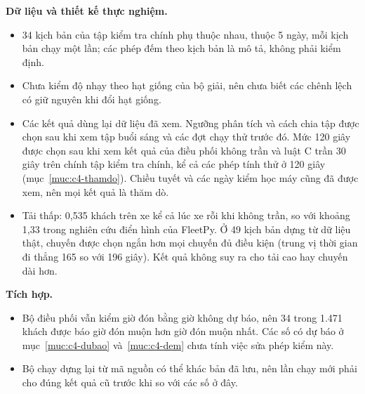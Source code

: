 \textbf{Dữ liệu và thiết kế thực nghiệm.}
\begin{itemize}[leftmargin=1.2cm,itemsep=2pt,topsep=3pt]
\item 34 kịch bản của tập kiểm tra chính phụ thuộc nhau, thuộc 5 ngày, mỗi kịch bản chạy một lần; các phép đếm theo
kịch bản là mô tả, không phải kiểm định.
\item Chưa kiểm độ nhạy theo hạt giống của bộ giải, nên chưa biết các chênh lệch có giữ nguyên khi đổi hạt giống.
\item Các kết quả dùng lại dữ liệu đã xem. Ngưỡng phân tích và cách chia tập được chọn sau khi xem tập buổi sáng và các
đợt chạy thử trước đó. Mức 120 giây được chọn sau khi xem kết quả của điều phối không trần và luật C trần 30 giây trên
chính tập kiểm tra chính, kể cả các phép tính thử ở 120 giây (mục~\ref{muc:c4-thamdo}). Chiều tuyết và các ngày kiểm học máy cũng đã được xem, nên mọi kết quả là thăm dò.
\item Tải thấp: 0,535 khách trên xe kể cả lúc xe rỗi khi không trần, so với khoảng 1,33 trong nghiên cứu điển hình của
FleetPy. Ở 49 kịch bản dựng từ dữ liệu thật, chuyến được chọn ngắn hơn mọi chuyến đủ điều kiện (trung vị thời gian đi thẳng 165
so với 196 giây). Kết quả không suy ra cho tải cao hay chuyến dài hơn.
\end{itemize}

\textbf{Tích hợp.}
\begin{itemize}[leftmargin=1.2cm,itemsep=2pt,topsep=3pt]
\item Bộ điều phối vẫn kiểm giờ đón bằng giờ không dự báo, nên 34 trong 1.471 khách được báo giờ đón muộn hơn giờ đón
muộn nhất. Các số có dự báo ở mục~\ref{muc:c4-dubao} và~\ref{muc:c4-dem} chưa tính việc sửa phép kiểm này.
\item Bộ chạy dựng lại từ mã nguồn có thể khác bản đã lưu, nên lần chạy mới phải cho đúng kết quả cũ trước khi so với
các số ở đây.
\end{itemize}

